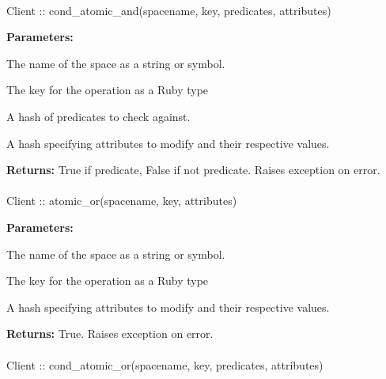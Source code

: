 \paragraph{}
\label{api:ruby:cond_atomic_and}
\begin{rubycode}
Client :: cond_atomic_and(spacename, key, predicates, attributes)
\end{rubycode}


\noindent\textbf{Parameters:}
\begin{description}[labelindent=\widthof{{\code{predicates}}},leftmargin=*,noitemsep,nolistsep,align=right]
\item[\code{spacename}] The name of the space as a string or symbol.
\item[\code{key}] The key for the operation as a Ruby type
\item[\code{predicates}] A hash of predicates to check against.
\item[\code{attributes}] A hash specifying attributes to modify and their respective values.
\end{description}

\noindent\textbf{Returns:}
True if predicate, False if not predicate.  Raises exception on error.

\paragraph{}
\label{api:ruby:atomic_or}
\begin{rubycode}
Client :: atomic_or(spacename, key, attributes)
\end{rubycode}


\noindent\textbf{Parameters:}
\begin{description}[labelindent=\widthof{{\code{attributes}}},leftmargin=*,noitemsep,nolistsep,align=right]
\item[\code{spacename}] The name of the space as a string or symbol.
\item[\code{key}] The key for the operation as a Ruby type
\item[\code{attributes}] A hash specifying attributes to modify and their respective values.
\end{description}

\noindent\textbf{Returns:}
True.  Raises exception on error.

\paragraph{}
\label{api:ruby:cond_atomic_or}
\begin{rubycode}
Client :: cond_atomic_or(spacename, key, predicates, attributes)
\end{rubycode}


